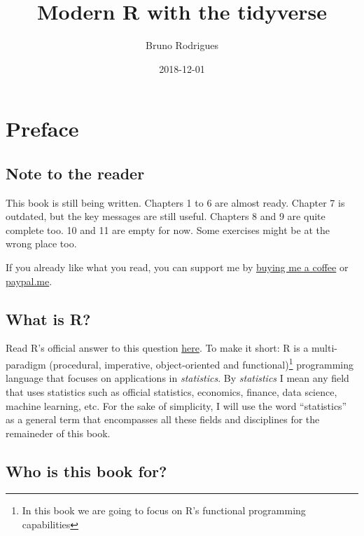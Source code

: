 \documentclass[]{gitbook}
\title{Modern R with the tidyverse}
\author{Bruno Rodrigues}
\date{2018-12-01}
\let\rmarkdownfootnote\footnote%
\def\footnote{\protect\rmarkdownfootnote}
\theoremstyle{definition}
\theoremstyle{definition}
\theoremstyle{definition}
\theoremstyle{remark}
\begin{document}
\maketitle

{
\setcounter{tocdepth}{2}
\tableofcontents
}
\hypertarget{preface}{%
\section*{Preface}\label{preface}}

\hypertarget{note-to-the-reader}{%
\subsection*{Note to the reader}\label{note-to-the-reader}}

This book is still being written. Chapters 1 to 6 are almost ready.
Chapter 7 is outdated, but the key messages are still useful. Chapters 8
and 9 are quite complete too. 10 and 11 are empty for now. Some
exercises might be at the wrong place too.

If you already like what you read, you can support me by
\href{https://www.buymeacoffee.com/brodriguesco}{buying me a coffee} or
\href{https://www.paypal.me/brodriguesco}{paypal.me}.

\hypertarget{what-is-r}{%
\subsection*{What is R?}\label{what-is-r}}

Read R's official answer to this question
\href{https://cran.r-project.org/doc/FAQ/R-FAQ.html\#What-is-R_003f}{here}.
To make it short: R is a multi-paradigm (procedural, imperative,
object-oriented and functional)\footnote{In this book we are going to
  focus on R's functional programming capabilities} programming language
that focuses on applications in \emph{statistics}. By \emph{statistics}
I mean any field that uses statistics such as official statistics,
economics, finance, data science, machine learning, etc. For the sake of
simplicity, I will use the word ``statistics'' as a general term that
encompasses all these fields and disciplines for the remaineder of this
book.

\hypertarget{who-is-this-book-for}{%
\subsection*{Who is this book for?}\label{who-is-this-book-for}}
\end{document}
